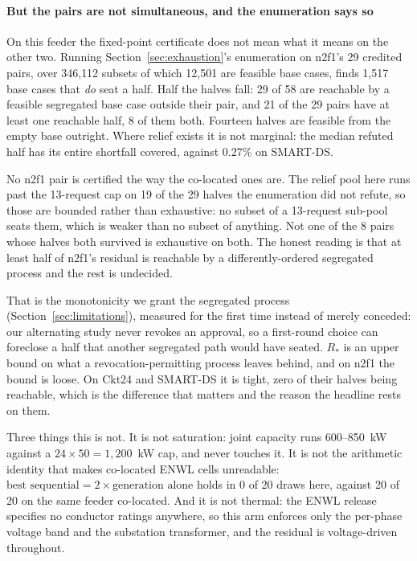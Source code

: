 \documentclass[review,authoryear,12pt]{elsarticle}
\begin{document}
\paragraph{But the pairs are not simultaneous, and the enumeration says so}
On this feeder the fixed-point certificate does not mean what it means on the
other two. Running Section~\ref{sec:exhaustion}'s enumeration on n2f1's 29
credited pairs, over 346{,}112 subsets of which 12{,}501 are feasible base
cases, finds 1{,}517 base cases that \emph{do} seat a half. Half the halves
fall: 29
of 58 are reachable by a feasible segregated base case outside their pair, and
21 of the 29 pairs have at least one reachable half, 8 of them both. Fourteen
halves are feasible from the empty base outright. Where relief exists it is
not marginal: the median refuted half has its entire shortfall covered,
against 0.27\% on SMART-DS.

No n2f1 pair is certified the way the co-located ones are. The relief pool here
runs past the 13-request cap on 19 of the 29 halves the enumeration did not
refute, so those are bounded rather than exhaustive: no subset of a 13-request
sub-pool seats them, which is weaker than no subset of anything. Not one of the
8 pairs whose halves both survived is exhaustive on both. The honest reading is
that at least half of n2f1's residual is reachable by a differently-ordered
segregated process and the rest is undecided.

That is the monotonicity we grant the segregated process
(Section~\ref{sec:limitations}), measured for the first time instead of merely
conceded: our alternating study never revokes an approval, so a first-round
choice can foreclose a half that another segregated path would have seated.
$R_{\ast}$ is an upper bound on what a revocation-permitting process leaves
behind, and on n2f1 the bound is loose. On Ckt24 and SMART-DS it is tight,
zero of their halves being reachable, which is the difference that matters and
the reason the headline rests on them.

Three things this is not. It is not saturation: joint capacity runs
600--850~kW against a $24 \times 50 = 1{,}200$~kW cap, and never touches it.
It is not the arithmetic identity that makes co-located ENWL cells unreadable:
$\text{best sequential} = 2 \times \text{generation alone}$ holds in 0 of 20
draws here, against 20 of 20 on the same feeder co-located. And it is not
thermal: the ENWL release specifies no conductor ratings anywhere, so this arm
enforces only the per-phase voltage band and the substation transformer, and
the residual is voltage-driven throughout.
\end{document}

